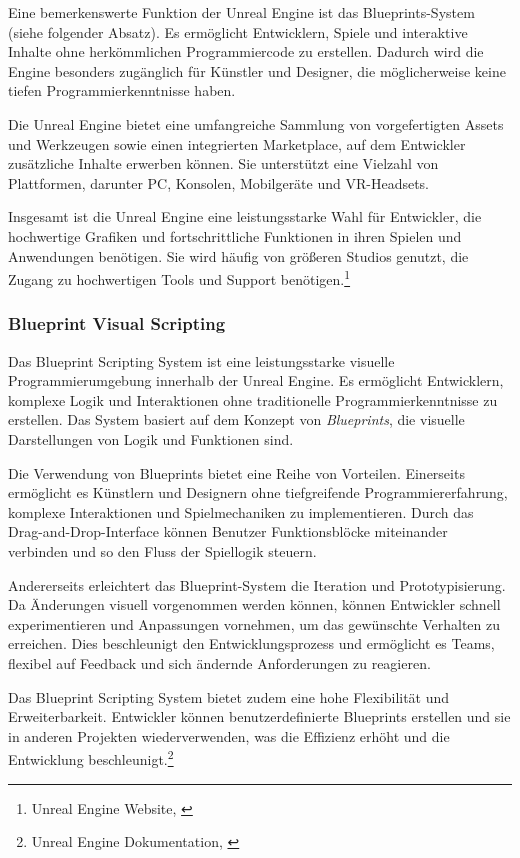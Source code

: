 Eine bemerkenswerte Funktion der Unreal Engine ist das Blueprints-System (siehe folgender Absatz). Es ermöglicht Entwicklern, Spiele und interaktive
Inhalte ohne herkömmlichen Programmiercode zu erstellen. Dadurch wird die Engine besonders zugänglich für Künstler und
Designer, die möglicherweise keine tiefen Programmierkenntnisse haben.

Die Unreal Engine bietet eine umfangreiche Sammlung von vorgefertigten Assets und Werkzeugen sowie einen integrierten
Marketplace, auf dem Entwickler zusätzliche Inhalte erwerben können. Sie unterstützt eine Vielzahl von Plattformen,
darunter PC, Konsolen, Mobilgeräte und VR-Headsets.

Insgesamt ist die Unreal Engine eine leistungsstarke Wahl für Entwickler, die hochwertige Grafiken und fortschrittliche
Funktionen in ihren Spielen und Anwendungen benötigen. Sie wird häufig von größeren Studios genutzt, die Zugang zu hochwertigen
Tools und Support benötigen.\footnote{Unreal Engine Website, \cite{https://www.unrealengine.com/}}

\subsubsection*{Blueprint Visual Scripting}
Das Blueprint Scripting System ist eine leistungsstarke visuelle Programmierumgebung innerhalb der Unreal Engine. Es
ermöglicht Entwicklern, komplexe Logik und Interaktionen ohne traditionelle Programmierkenntnisse zu erstellen. Das System
basiert auf dem Konzept von \textit{Blueprints}, die visuelle Darstellungen von Logik und Funktionen sind.

Die Verwendung von Blueprints bietet eine Reihe von Vorteilen. Einerseits ermöglicht es Künstlern und Designern ohne
tiefgreifende Programmiererfahrung, komplexe Interaktionen und Spielmechaniken zu implementieren. Durch das Drag-and-Drop-Interface
können Benutzer Funktionsblöcke miteinander verbinden und so den Fluss der Spiellogik steuern.

Andererseits erleichtert das Blueprint-System die Iteration und Prototypisierung. Da Änderungen visuell vorgenommen
werden können, können Entwickler schnell experimentieren und Anpassungen vornehmen, um das gewünschte Verhalten zu erreichen.
Dies beschleunigt den Entwicklungsprozess und ermöglicht es Teams, flexibel auf Feedback und sich ändernde Anforderungen zu reagieren.

Das Blueprint Scripting System bietet zudem eine hohe Flexibilität und Erweiterbarkeit. Entwickler können benutzerdefinierte
Blueprints erstellen und sie in anderen Projekten wiederverwenden, was die Effizienz erhöht und die Entwicklung
beschleunigt.\footnote{Unreal Engine Dokumentation, \cite{Blueprint Visual Scripting}}

